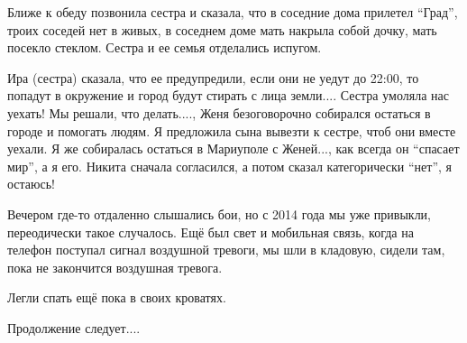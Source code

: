 Ближе к обеду позвонила сестра и сказала, что в соседние дома прилетел \enquote{Град},
троих соседей нет в живых, в соседнем доме мать накрыла собой дочку, мать
посекло стеклом. Сестра и ее семья отделались испугом.

Ира (сестра) сказала, что ее предупредили, если они не уедут до 22:00, то
попадут в окружение и город будут стирать с лица земли.... Сестра умоляла нас
уехать! Мы решали, что делать...., Женя безоговорочно собирался остаться в городе
и помогать людям. Я предложила сына вывезти к сестре, чтоб они вместе уехали. Я
же собиралась остаться в Мариуполе с Женей..., как всегда он \enquote{спасает мир}, а я
его. Никита сначала согласился, а потом сказал категорически \enquote{нет}, я остаюсь!

Вечером где-то отдаленно слышались бои, но с 2014 года мы уже привыкли,
переодически такое случалось. Ещё был свет и мобильная связь, когда на телефон
поступал сигнал воздушной тревоги, мы шли в кладовую, сидели там, пока не
закончится воздушная тревога. 

Легли спать ещё пока в своих кроватях. 

Продолжение следует....

